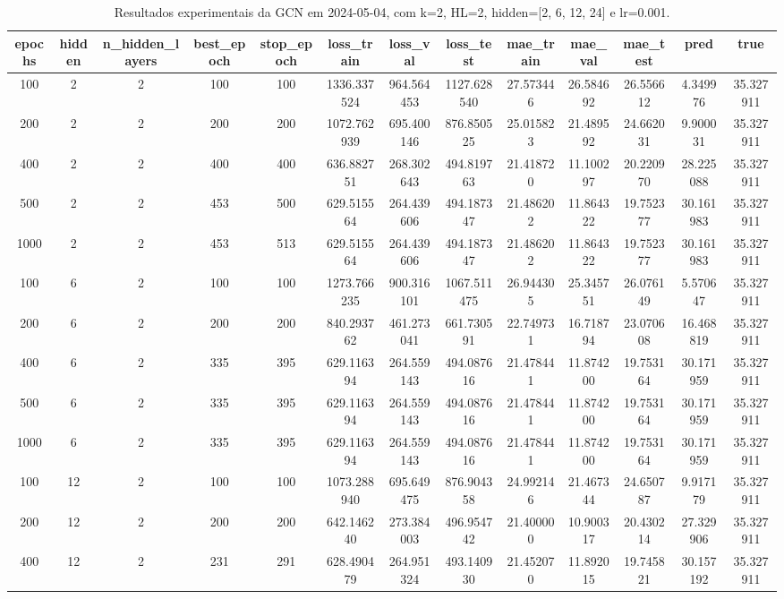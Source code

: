 \begin{table}[h]
\centering
\caption{Resultados experimentais da GCN em 2024-05-04, com k=2, HL=2, hidden=[2, 6, 12, 24] e lr=0.001.}
\label{tab:gcn_results_k2_hl2_d20240504}
\begin{tabular}{ccccccccccccc}
\toprule
epochs & hidden & n\_hidden\_layers & best\_epoch & stop\_epoch & loss\_train & loss\_val & loss\_test & mae\_train & mae\_val & mae\_test & pred & true \\
\midrule
100 & 2 & 2 & 100 & 100 & 1336.337524 & 964.564453 & 1127.628540 & 27.573446 & 26.584692 & 26.556612 & 4.349976 & 35.327911 \\
200 & 2 & 2 & 200 & 200 & 1072.762939 & 695.400146 & 876.850525 & 25.015823 & 21.489592 & 24.662031 & 9.900031 & 35.327911 \\
400 & 2 & 2 & 400 & 400 & 636.882751 & 268.302643 & 494.819763 & 21.418720 & 11.100297 & 20.220970 & 28.225088 & 35.327911 \\
500 & 2 & 2 & 453 & 500 & 629.515564 & 264.439606 & 494.187347 & 21.486202 & 11.864322 & 19.752377 & 30.161983 & 35.327911 \\
1000 & 2 & 2 & 453 & 513 & 629.515564 & 264.439606 & 494.187347 & 21.486202 & 11.864322 & 19.752377 & 30.161983 & 35.327911 \\
100 & 6 & 2 & 100 & 100 & 1273.766235 & 900.316101 & 1067.511475 & 26.944305 & 25.345751 & 26.076149 & 5.570647 & 35.327911 \\
200 & 6 & 2 & 200 & 200 & 840.293762 & 461.273041 & 661.730591 & 22.749731 & 16.718794 & 23.070608 & 16.468819 & 35.327911 \\
400 & 6 & 2 & 335 & 395 & 629.116394 & 264.559143 & 494.087616 & 21.478441 & 11.874200 & 19.753164 & 30.171959 & 35.327911 \\
500 & 6 & 2 & 335 & 395 & 629.116394 & 264.559143 & 494.087616 & 21.478441 & 11.874200 & 19.753164 & 30.171959 & 35.327911 \\
1000 & 6 & 2 & 335 & 395 & 629.116394 & 264.559143 & 494.087616 & 21.478441 & 11.874200 & 19.753164 & 30.171959 & 35.327911 \\
100 & 12 & 2 & 100 & 100 & 1073.288940 & 695.649475 & 876.904358 & 24.992146 & 21.467344 & 24.650787 & 9.917179 & 35.327911 \\
200 & 12 & 2 & 200 & 200 & 642.146240 & 273.384003 & 496.954742 & 21.400000 & 10.900317 & 20.430214 & 27.329906 & 35.327911 \\
400 & 12 & 2 & 231 & 291 & 628.490479 & 264.951324 & 493.140930 & 21.452070 & 11.892015 & 19.745821 & 30.157192 & 35.327911 \\

\end{tabular}
\end{table}
